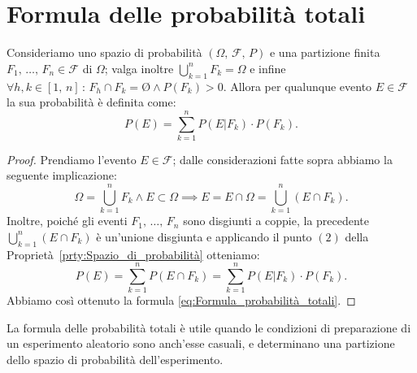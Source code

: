     \section{Formula delle probabilità totali}
        \begin{defn}\label{defn:Probabilità_totali}
            Consideriamo uno spazio di probabilità $(\Omega,\,\mathscr{F},\,P)$ e una partizione finita $F_1,\,\ldots,\,F_n \in \mathscr{F}$ di $\Omega$; valga inoltre $\bigcup_{k=1}^{n} F_k = \Omega$ e infine $\forall h,k \in [1,\,n] \,:\, F_h \cap F_k = \text{\O} \land P(F_k) > 0$.
            Allora per qualunque evento $E \in \mathscr{F}$ la sua probabilità è definita come:
            \begin{equation}\label{eq:Formula_probabilità_totali}
                P(E) = \sum_{k=1}^{n} P(E|F_k) \cdot P(F_k)
            . 
            \end{equation}
        \end{defn}
        \begin{proof}
            Prendiamo l'evento $E \in \mathscr{F}$; dalle considerazioni fatte sopra abbiamo la seguente implicazione:  \[
                \Omega = \bigcup_{k=1}^{n} F_k \land E \subset \Omega \implies E = E \cap \Omega = \bigcup_{k=1}^{n} (E \cap F_k)
            .\] 
            Inoltre, poiché gli eventi $F_1,\,\ldots,\,F_n$ sono disgiunti a coppie, la precedente $\bigcup_{k=1}^{n} (E \cap F_k)$ è un'unione disgiunta e applicando il punto $(2)$ della Proprietà~\ref{prty:Spazio_di_probabilità} otteniamo: \[
                P(E) = \sum_{k=1}^{n} P(E \cap F_k) = \sum_{k=1}^{n} P(E|F_k) \cdot P(F_k)
            .\] 
            Abbiamo così ottenuto la formula \eqref{eq:Formula_probabilità_totali}.
        \end{proof}
        \begin{obsv}
            La formula delle probabilità totali è utile quando le condizioni di preparazione di un esperimento aleatorio sono anch'esse casuali, e determinano una partizione dello spazio di probabilità dell'esperimento.
        \end{obsv}

